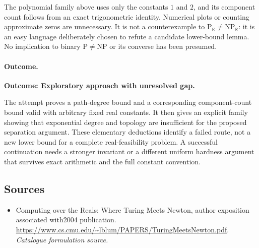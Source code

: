 \documentclass[11pt,a4paper]{article}
\newcommand{\R}{\mathbb{R}}
\numberwithin{equation}{section}
\begin{document}
The polynomial family above uses only the constants $1$ and $2$, and its
component count follows from an exact trigonometric identity. Numerical
plots or counting approximate zeros are unnecessary. It is not a
counterexample to $\mathrm P_{\R}\ne\mathrm{NP}_{\R}$: it is an easy
language deliberately chosen to refute a candidate lower-bound lemma.
No implication to binary $\mathrm P\ne\mathrm{NP}$ or its converse has
been presumed.

\paragraph{Outcome.}
\textbf{Outcome: Exploratory approach with unresolved gap.}

The attempt proves a path-degree bound and a corresponding component-count
bound valid with arbitrary fixed real constants. It then gives an explicit
family showing that exponential degree and topology are insufficient for
the proposed separation argument. These elementary deductions identify a
failed route, not a new lower bound for a complete real-feasibility problem.
A successful continuation needs a stronger invariant or a different
uniform hardness argument that survives exact arithmetic and the full
constant convention.
\subsection{Sources}
\begin{itemize}\raggedright
\item[\textnormal{[S1]}]\hypertarget{source:30006767:1}{} Computing over the Reals: Where Turing Meets Newton, author exposition associated with2004 publication.
\url{https://www.cs.cmu.edu/~lblum/PAPERS/TuringMeetsNewton.pdf}.
{\small\textit{Catalogue formulation source.}}
\end{itemize}
\end{document}
